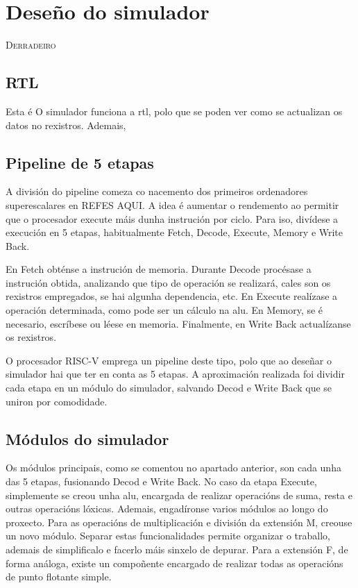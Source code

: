 \chapter{Deseño do simulador}
\label{chap:deseño_simulador}

\lettrine{D}{erradeiro} 
\section{RTL}\label{sec:rtl}
Esta é 
O simulador funciona a \acrfull{rtl}, polo que se poden ver como se actualizan os datos no rexistros. Ademais, 


\section{Pipeline de 5 etapas}\label{sec:pipeline_5etapas}
A división do pipeline comeza co nacemento dos primeiros ordenadores superescalares en REFES AQUI. A idea é aumentar o rendemento ao permitir que o procesador execute máis dunha instrución por ciclo. Para iso, divídese a execución en 5 etapas, habitualmente Fetch, Decode, Execute, Memory e Write Back.


En Fetch obténse a instrución de memoria. Durante Decode procésase a instrución obtida, analizando que tipo de operación se realizará, cales son os rexistros empregados, se hai algunha dependencia, etc. En Execute realízase a operación determinada, como pode ser un cálculo na \acrfull{alu}. En Memory, se é necesario, escríbese ou léese en memoria. Finalmente, en Write Back actualízanse os rexistros.


O procesador RISC-V emprega un pipeline deste tipo, polo que ao deseñar o simulador hai que ter en conta as 5 etapas. A aproximación realizada foi dividir cada etapa en un módulo do simulador, salvando Decod e Write Back que se uniron por comodidade.

\section{Módulos do simulador}\label{sec:modulso_sim}
Os módulos principais, como se comentou no apartado anterior, son cada unha das 5 etapas, fusionando Decod e Write Back. No caso da etapa Execute, simplemente se creou unha \acrshort{alu}, encargada de realizar operacións de suma, resta e outras operacións lóxicas. Ademais, engadíronse varios módulos ao longo do proxecto. Para as operacións de multiplicación e división da extensión M, creouse un novo módulo. Separar estas funcionalidades permite organizar o traballo, ademais de simplificalo e facerlo máis sinxelo de depurar. Para a extensión F, de forma análoga, existe un compoñente encargado de realizar todas as operacións de punto flotante simple.

